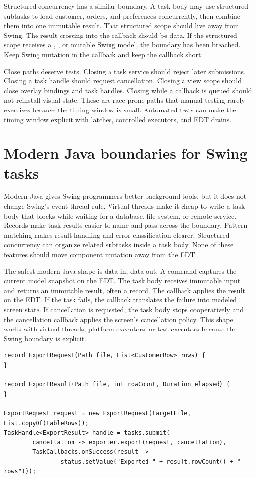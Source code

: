 Structured concurrency has a similar boundary. A task body may use structured
subtasks to load customer, orders, and preferences concurrently, then combine
them into one immutable result. That structured scope should live away from
Swing. The result crossing into the callback should be data. If the structured
scope receives a , , or mutable Swing model, the
boundary has been breached. Keep Swing mutation in the callback and keep the
callback short.

Close paths deserve tests. Closing a task service should reject later
submissions. Closing a task handle should request cancellation. Closing a view
scope should close overlay bindings and task handles. Closing while a callback
is queued should not reinstall visual state. These are race-prone paths that
manual testing rarely exercises because the timing window is small. Automated
tests can make the timing window explicit with latches, controlled executors,
and EDT drains.

\section{Modern Java boundaries for Swing tasks}

Modern Java gives Swing programmers better background tools, but it does not
change Swing's event-thread rule. Virtual threads make it cheap to write a task
body that blocks while waiting for a database, file system, or remote service.
Records make task results easier to name and pass across the boundary. Pattern
matching makes result handling and error classification clearer. Structured
concurrency can organize related subtasks inside a task body. None of these
features should move component mutation away from the EDT.

The safest modern-Java shape is data-in, data-out. A command captures the
current model snapshot on the EDT. The task body receives immutable input and
returns an immutable result, often a record. The callback applies the result on
the EDT. If the task fails, the callback translates the failure into modeled
screen state. If cancellation is requested, the task body stops cooperatively
and the cancellation callback applies the screen's cancellation policy. This
shape works with virtual threads, platform executors, or test executors because
the Swing boundary is explicit.

\begin{lstlisting}[caption={Records make task input and output explicit.}]
record ExportRequest(Path file, List<CustomerRow> rows) {
}

record ExportResult(Path file, int rowCount, Duration elapsed) {
}

ExportRequest request = new ExportRequest(targetFile, List.copyOf(tableRows));
TaskHandle<ExportResult> handle = tasks.submit(
        cancellation -> exporter.export(request, cancellation),
        TaskCallbacks.onSuccess(result ->
                status.setValue("Exported " + result.rowCount() + " rows")));
\end{lstlisting}

